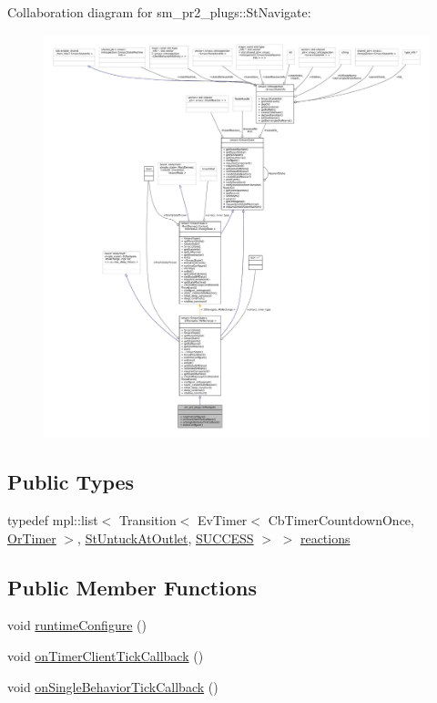 Collaboration diagram for sm\+\_\+pr2\+\_\+plugs\+:\+:St\+Navigate\+:
\nopagebreak
\begin{figure}[H]
\begin{center}
\leavevmode
\includegraphics[width=350pt]{structsm__pr2__plugs_1_1StNavigate__coll__graph}
\end{center}
\end{figure}
\subsection*{Public Types}
\begin{DoxyCompactItemize}
\item 
typedef mpl\+::list$<$ Transition$<$ Ev\+Timer$<$ Cb\+Timer\+Countdown\+Once, \hyperlink{classsm__pr2__plugs_1_1OrTimer}{Or\+Timer} $>$, \hyperlink{structsm__pr2__plugs_1_1StUntuckAtOutlet}{St\+Untuck\+At\+Outlet}, \hyperlink{classSUCCESS}{S\+U\+C\+C\+E\+SS} $>$ $>$ \hyperlink{structsm__pr2__plugs_1_1StNavigate_a11299afba109067d019e8526f10f2286}{reactions}
\end{DoxyCompactItemize}
\subsection*{Public Member Functions}
\begin{DoxyCompactItemize}
\item 
void \hyperlink{structsm__pr2__plugs_1_1StNavigate_ae7ab6b7fda6772eb50c512da21085cc0}{runtime\+Configure} ()
\item 
void \hyperlink{structsm__pr2__plugs_1_1StNavigate_a6340d786397971eff5772816cdf7affc}{on\+Timer\+Client\+Tick\+Callback} ()
\item 
void \hyperlink{structsm__pr2__plugs_1_1StNavigate_a0e58e927f01a817040c13987ecd4695f}{on\+Single\+Behavior\+Tick\+Callback} ()
\end{DoxyCompactItemize}
